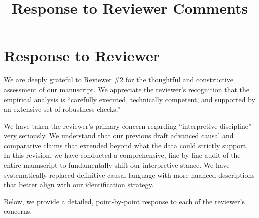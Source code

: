 \documentclass[12pt]{article}
\title{\textbf{Response to Reviewer Comments}}
\date{}
\begin{document}
\maketitle

\section*{Response to Reviewer}

We are deeply grateful to Reviewer \#2 for the thoughtful and constructive assessment of our manuscript. We appreciate the reviewer's recognition that the empirical analysis is ``carefully executed, technically competent, and supported by an extensive set of robustness checks.''

We have taken the reviewer's primary concern regarding ``interpretive discipline'' very seriously. We understand that our previous draft advanced causal and comparative claims that extended beyond what the data could strictly support. In this revision, we have conducted a comprehensive, line-by-line audit of the entire manuscript to fundamentally shift our interpretive stance. We have systematically replaced definitive causal language with more nuanced descriptions that better align with our identification strategy.

Below, we provide a detailed, point-by-point response to each of the reviewer's concerns.
\end{document}
